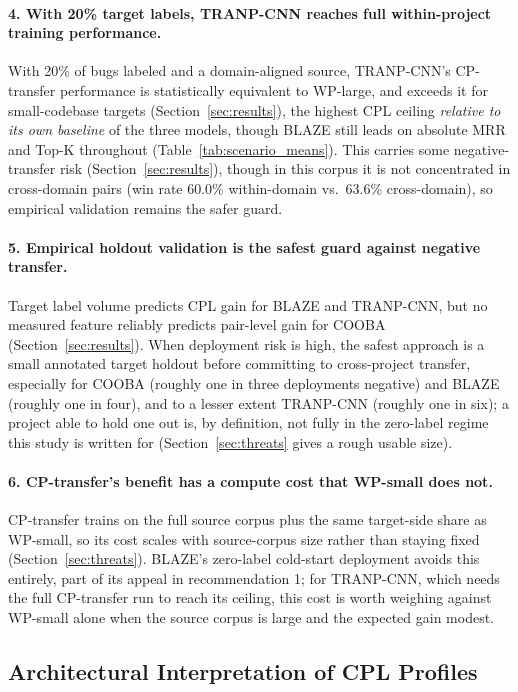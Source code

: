 \documentclass[a4paper,fleqn]{cas-dc}
\begin{document}
\paragraph{4. With 20\% target labels, TRANP-CNN reaches full within-project training performance.}
With 20\% of bugs labeled and a domain-aligned source, TRANP-CNN's
CP-transfer performance is statistically equivalent to WP-large, and exceeds
it for small-codebase targets (Section~\ref{sec:results}), the highest CPL
ceiling \emph{relative to its own baseline} of the three models, though BLAZE
still leads on absolute MRR and Top-K throughout
(Table~\ref{tab:scenario_means}). This carries some
negative-transfer risk (Section~\ref{sec:results}), though in this corpus it is not
concentrated in cross-domain pairs (win rate 60.0\% within-domain vs.\ 63.6\%
cross-domain), so empirical validation remains the safer guard.

\paragraph{5. Empirical holdout validation is the safest guard against negative transfer.}
Target label volume predicts CPL gain for BLAZE and TRANP-CNN, but no
measured feature reliably predicts pair-level gain for COOBA
(Section~\ref{sec:results}). When deployment risk is high, the safest
approach is a small annotated target holdout before committing to
cross-project transfer, especially for COOBA (roughly one in three
deployments negative) and BLAZE (roughly one in four), and to a lesser extent
TRANP-CNN (roughly one in six); a project able to hold one out is, by definition, not fully in the
zero-label regime this study is written for (Section~\ref{sec:threats}
gives a rough usable size).

\paragraph{6. CP-transfer's benefit has a compute cost that WP-small does not.}
CP-transfer trains on the full source corpus plus the same target-side share
as WP-small, so its cost scales with source-corpus size rather than
staying fixed (Section~\ref{sec:threats}). BLAZE's zero-label cold-start
deployment avoids this entirely, part of its appeal in
recommendation 1; for TRANP-CNN, which needs the full CP-transfer run to
reach its ceiling, this cost is worth weighing against WP-small alone when
the source corpus is large and the expected gain modest.

\subsection{Architectural Interpretation of CPL Profiles}
\label{sec:architecture}
\end{document}
